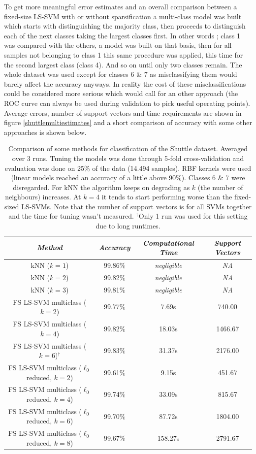 To get more meaningful error estimates and an overall comparison between a fixed-size LS-SVM with or without sparsification a multi-class model was built which starts with distinguishing the majority class, then proceeds to distinguish each of the next classes taking the largest classes first. In other words ; class 1 was compared with the others, a model was built on that basis, then for all samples not belonging to class 1 this same procedure was applied, this time for the second largest class (class 4). And so on until only two classes remain. The whole dataset was used except for classes 6 \& 7 as misclassifying them would barely affect the accuracy anyways. In reality the cost of these misclassifications could be considered more serious which would call for an other approach (the ROC curve can always be used during validation to pick useful operating points). Average errors, number of support vectors and time requirements are shown in figure \ref{shuttlemultiestimates} and a short comparison of accuracy with some other approaches is shown below.

\begin{table}[htb]
\centering
\begin{tabular}{c|ccc}
\textit{Method} & \textit{Accuracy} & \textit{Computational Time} & \textit{Support Vectors} \\\hline
kNN ($k=1$) & 99.86\% & \textit{negligible} & \textit{NA} \\
kNN ($k=2$) & 99.82\% & \textit{negligible} & \textit{NA} \\
kNN ($k=3$) & 99.81\% & \textit{negligible} & \textit{NA} \\
FS LS-SVM multiclass ($k=2$) & 99.77\% & 7.69s & 740.00 \\
FS LS-SVM multiclass ($k=4$) & 99.82\% & 18.03s & 1466.67 \\
FS LS-SVM multiclass ($k=6$)$^{\dagger}$ & 99.83\% & 31.37s & 2176.00 \\
FS LS-SVM multiclass ($\ell_0$ reduced, $k=2$) & 99.61\% & 9.15s & 451.67 \\
FS LS-SVM multiclass ($\ell_0$ reduced, $k=4$) & 99.74\% & 33.09s & 815.67 \\
FS LS-SVM multiclass ($\ell_0$ reduced, $k=6$) & 99.70\% & 87.72s & 1804.00 \\
FS LS-SVM multiclass ($\ell_0$ reduced, $k=8$) & 99.67\% & 158.27s & 2791.67 \\
\end{tabular}
\caption{Comparison of some methods for classification of the Shuttle dataset. Averaged over 3 runs. Tuning the models was done through 5-fold cross-validation and evaluation was done on 25\% of the data (14.494 samples). RBF kernels were used (linear models reached an accuracy of a little above 90\%). Classes 6 \& 7 were disregarded. For kNN the algorithm keeps on degrading as $k$ (the number of neighbours) increases. At $k=4$ it tends to start performing worse than the fixed-sized LS-SVMs. Note that the number of support vectors is for all SVMs together and the time for tuning wasn't measured. $^{\dagger}$Only 1 run was used for this setting due to long runtimes.}
\label{shuttlemulticomparison}
\end{table}

